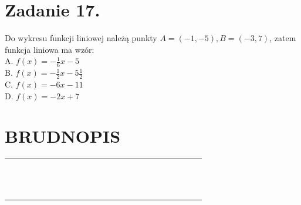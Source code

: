 \documentclass[10pt]{article}
\begin{document}
\section*{Zadanie 17.}
Do wykresu funkcji liniowej należą punkty \(A=(-1,-5), B=(-3,7)\), zatem funkcja liniowa ma wzór:\\
A. \(f(x)=-\frac{1}{6} x-5\)\\
B. \(f(x)=-\frac{1}{2} x-5 \frac{1}{2}\)\\
C. \(f(x)=-6 x-11\)\\
D. \(f(x)=-2 x+7\)

\section*{BRUDNOPIS}
\begin{center}
\begin{tabular}{|c|c|c|c|c|c|c|c|c|c|c|c|c|c|c|c|c|c|c|c|c|c|c|c|}
\hline
 &  &  &  &  &  &  &  &  &  &  &  &  &  &  &  &  &  &  &  &  &  &  &  \\
\hline
 &  &  &  &  &  &  &  &  &  &  &  &  &  &  &  &  &  &  &  &  &  &  &  \\
\hline
 &  &  &  &  &  &  &  &  &  &  &  &  &  &  &  &  &  &  &  &  &  &  &  \\
\hline
 &  &  &  &  &  &  &  &  &  &  &  &  &  &  &  &  &  &  &  &  &  &  &  \\
\hline
 &  &  &  &  &  &  &  &  &  &  &  &  &  &  &  &  &  &  &  &  &  &  &  \\
\hline
 &  &  &  &  &  &  &  &  &  &  &  &  &  &  &  &  &  &  &  &  &  &  &  \\
\hline
 &  &  &  &  &  &  &  &  &  &  &  &  &  &  &  &  &  &  &  &  &  &  &  \\
\hline
 &  &  &  &  &  &  &  &  &  &  &  &  &  &  &  &  &  &  &  &  &  &  &  \\
\hline
 &  &  &  &  &  &  &  &  &  &  &  &  &  &  &  &  &  &  &  &  &  &  &  \\
\hline
 &  &  &  &  &  &  &  &  &  &  &  &  &  &  &  &  &  &  &  &  &  &  &  \\
\hline
 &  &  &  &  &  &  &  &  &  &  &  &  &  &  &  &  &  &  &  &  &  &  &  \\
\hline
 &  &  &  &  &  &  &  &  &  &  &  &  &  &  &  &  &  &  &  &  &  &  &  \\
\hline
 &  &  &  &  &  &  &  &  &  &  &  &  &  &  &  &  &  &  &  &  &  &  &  \\
\hline
 &  &  &  &  &  &  &  &  &  &  &  &  &  &  &  &  &  &  &  &  &  &  &  \\

\end{tabular}
\end{center}
\end{document}
